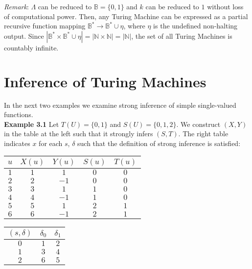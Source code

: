 \documentclass[11pt]{article}
\newcommand{\N}{\mathbb{N}}
\newcommand{\B}{\mathbb{B}}
\begin{document}
\bigbreak

\textit{Remark}: $\Lambda$ can be reduced to $ \B = \{0, 1\} $ and $ k $ can be reduced to $ 1 $ without loss of computational power. Then, any Turing Machine can be expressed as a partial recursive function mapping $ \B^{*} \rightarrow \B^{*} \cup \eta $, where $ \eta $ is the undefined non-halting output. Since $ |\B^{*} \times \B^{*} \cup \eta | = | \N \times \N | = | \N | $, the set of all Turing Machines is countably infinite. 

\pagebreak

\section{Inference of Turing Machines} 
 
 In the next two examples we examine strong inference of simple single-valued functions. \\
 
 
 \textbf{Example 3.1} \quad Let $ T(U) = \{0 , 1\} $ and $ S(U) = \{0, 1, 2\} $. We construct $ (X, Y) $ in the table at the left such that it strongly infers $ (S, T) $. The right table indicates $ x $ for each $ s $, $ \delta $ such that the definition of strong inference is satisfied: \\ 
 \begin {center}
 \begin{tabular}{ c||c|c|c|c } 

 $ u $ & $ X(u) $ & $ Y(u) $ & $ S(u) $ & $ T(u) $ \\ 
 \hline
 \hline
 $ 1 $ & $ 1 $ & $ 1 $ & $ 0 $ & $ 0 $ \\
 \hline
 $ 2 $ & $ 2 $ & $ -1 $ & $ 0 $ & $ 0 $ \\
 \hline
 $ 3 $ & $ 3 $ & $ 1 $ & $ 1 $ & $ 0 $ \\
 \hline
 $ 4 $ & $ 4 $ & $ -1 $ & $ 1 $ & $ 0 $ \\
 \hline 
 $ 5 $ & $ 5 $ & $ 1 $ & $ 2 $ & $ 1 $ \\
 \hline 
 $ 6 $ & $ 6 $ & $ -1 $ & $ 2 $ & $ 1 $ \\
 \end{tabular} 
 \quad 
 \begin{tabular}{ c||c|c } 

 $ (s, \delta) $ & $ \delta_0 $ & $ \delta_1 $ \\ 
 \hline
 \hline
 $ 0 $ & $ 1 $ & $ 2 $  \\
 \hline
 $ 1 $ & $ 3 $ & $ 4 $ \\
 \hline
 $ 2 $ & $ 6 $ & $ 5 $ \\
 
 \end{tabular}
 \end{center}
 
\end{document}
